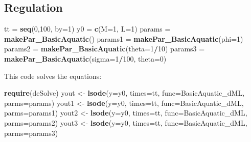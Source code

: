 \documentclass[
]{book}
\newenvironment{Shaded}{\begin{snugshade}}{\end{snugshade}}
\newcommand{\AttributeTok}[1]{\textcolor[rgb]{0.13,0.29,0.53}{#1}}
\newcommand{\DecValTok}[1]{\textcolor[rgb]{0.00,0.00,0.81}{#1}}
\newcommand{\FunctionTok}[1]{\textcolor[rgb]{0.13,0.29,0.53}{\textbf{#1}}}
\newcommand{\NormalTok}[1]{#1}
\newcommand{\OtherTok}[1]{\textcolor[rgb]{0.56,0.35,0.01}{#1}}
\newcommand{\SpecialCharTok}[1]{\textcolor[rgb]{0.81,0.36,0.00}{\textbf{#1}}}
\begin{document}
\hypertarget{regulation-1}{%
\subsection{Regulation}\label{regulation-1}}

\begin{Shaded}
\begin{Highlighting}[]
\NormalTok{tt }\OtherTok{=} \FunctionTok{seq}\NormalTok{(}\DecValTok{0}\NormalTok{,}\DecValTok{100}\NormalTok{, }\AttributeTok{by=}\DecValTok{1}\NormalTok{) }
\NormalTok{y0 }\OtherTok{=} \FunctionTok{c}\NormalTok{(}\AttributeTok{M=}\DecValTok{1}\NormalTok{, }\AttributeTok{L=}\DecValTok{1}\NormalTok{)}
\NormalTok{params }\OtherTok{=} \FunctionTok{makePar\_BasicAquatic}\NormalTok{()}
\NormalTok{params1 }\OtherTok{=} \FunctionTok{makePar\_BasicAquatic}\NormalTok{(}\AttributeTok{phi=}\DecValTok{1}\NormalTok{)}
\NormalTok{params2 }\OtherTok{=} \FunctionTok{makePar\_BasicAquatic}\NormalTok{(}\AttributeTok{theta=}\DecValTok{1}\SpecialCharTok{/}\DecValTok{10}\NormalTok{)}
\NormalTok{params3 }\OtherTok{=} \FunctionTok{makePar\_BasicAquatic}\NormalTok{(}\AttributeTok{sigma=}\DecValTok{1}\SpecialCharTok{/}\DecValTok{100}\NormalTok{, }\AttributeTok{theta=}\DecValTok{0}\NormalTok{)}
\end{Highlighting}
\end{Shaded}

This code solves the equations:

\begin{Shaded}
\begin{Highlighting}[]
\FunctionTok{require}\NormalTok{(deSolve)}
\NormalTok{yout  }\OtherTok{\textless{}{-}} \FunctionTok{lsode}\NormalTok{(}\AttributeTok{y=}\NormalTok{y0, }\AttributeTok{times=}\NormalTok{tt, }\AttributeTok{func=}\NormalTok{BasicAquatic\_dML, }\AttributeTok{parms=}\NormalTok{params) }
\NormalTok{yout1 }\OtherTok{\textless{}{-}} \FunctionTok{lsode}\NormalTok{(}\AttributeTok{y=}\NormalTok{y0, }\AttributeTok{times=}\NormalTok{tt, }\AttributeTok{func=}\NormalTok{BasicAquatic\_dML, }\AttributeTok{parms=}\NormalTok{params1) }
\NormalTok{yout2 }\OtherTok{\textless{}{-}} \FunctionTok{lsode}\NormalTok{(}\AttributeTok{y=}\NormalTok{y0, }\AttributeTok{times=}\NormalTok{tt, }\AttributeTok{func=}\NormalTok{BasicAquatic\_dML, }\AttributeTok{parms=}\NormalTok{params2) }
\NormalTok{yout3 }\OtherTok{\textless{}{-}} \FunctionTok{lsode}\NormalTok{(}\AttributeTok{y=}\NormalTok{y0, }\AttributeTok{times=}\NormalTok{tt, }\AttributeTok{func=}\NormalTok{BasicAquatic\_dML, }\AttributeTok{parms=}\NormalTok{params3) }
\end{Highlighting}
\end{Shaded}
\end{document}
